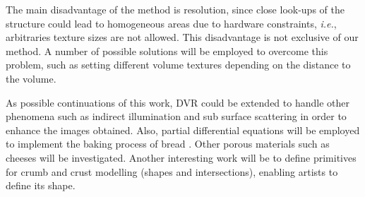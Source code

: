 \documentclass[oneside,a4paper,english,links]{amca}
\begin{document}
The main disadvantage of the method is resolution, since close look-ups of the structure could lead to homogeneous areas due to hardware constraints, {\em i.e.}, arbitraries texture sizes are not allowed. This disadvantage is not exclusive of our method. A number of possible solutions will be employed to overcome this problem, such as setting different volume textures depending on the distance to the volume. 

As possible continuations of this work, DVR could be extended to handle other phenomena such as indirect illumination and sub surface scattering in order to enhance the images obtained. Also, partial differential equations will be employed to implement the baking process of bread \citep{Purlis2012}. Other porous materials such as cheeses will be investigated. Another interesting work will be to define primitives for crumb and crust modelling (shapes and intersections), enabling artists to define its shape.

%

\end{document}
